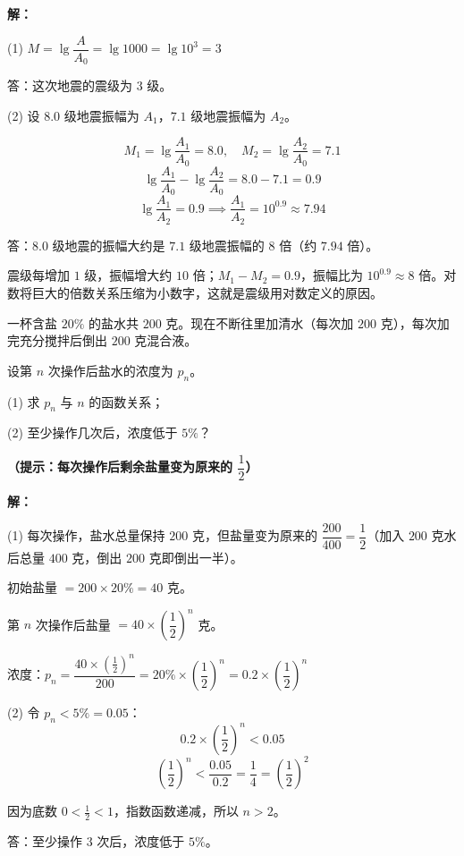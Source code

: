 \documentclass[12pt, a4paper]{ctexart}
\begin{document}
\textbf{解：}

(1) $M = \lg \dfrac{A}{A_0} = \lg 1000 = \lg 10^3 = 3$

答：这次地震的震级为 $3$ 级。

(2) 设 $8.0$ 级地震振幅为 $A_1$，$7.1$ 级地震振幅为 $A_2$。

\[
M_1 = \lg \frac{A_1}{A_0} = 8.0, \quad M_2 = \lg \frac{A_2}{A_0} = 7.1
\]
\[
\lg \frac{A_1}{A_0} - \lg \frac{A_2}{A_0} = 8.0 - 7.1 = 0.9
\]
\[
\lg \frac{A_1}{A_2} = 0.9 \implies \frac{A_1}{A_2} = 10^{0.9} \approx 7.94
\]

答：$8.0$ 级地震的振幅大约是 $7.1$ 级地震振幅的 $8$ 倍（约 $7.94$ 倍）。

\begin{tipbox}[生活中的对数]
震级每增加 $1$ 级，振幅增大约 $10$ 倍；$M_1 - M_2 = 0.9$，振幅比为 $10^{0.9}\approx 8$ 倍。对数将巨大的倍数关系压缩为小数字，这就是震级用对数定义的原因。
\end{tipbox}

\begin{appbox}[【应用3】溶液稀释问题]
一杯含盐 $20\%$ 的盐水共 $200$ 克。现在不断往里加清水（每次加 $200$ 克），每次加完充分搅拌后倒出 $200$ 克混合液。

设第 $n$ 次操作后盐水的浓度为 $p_n$。

(1) 求 $p_n$ 与 $n$ 的函数关系；

(2) 至少操作几次后，浓度低于 $5\%$？

\textbf{（提示：每次操作后剩余盐量变为原来的 $\dfrac{1}{2}$）}
\end{appbox}

\textbf{解：}

(1) 每次操作，盐水总量保持 $200$ 克，但盐量变为原来的 $\dfrac{200}{400} = \dfrac{1}{2}$（加入 $200$ 克水后总量 $400$ 克，倒出 $200$ 克即倒出一半）。

初始盐量 $= 200 \times 20\% = 40$ 克。

第 $n$ 次操作后盐量 $= 40 \times \left(\dfrac{1}{2}\right)^n$ 克。

浓度：$p_n = \dfrac{40 \times (\frac{1}{2})^n}{200} = 20\% \times \left(\dfrac{1}{2}\right)^n = 0.2 \times \left(\dfrac{1}{2}\right)^n$

(2) 令 $p_n < 5\% = 0.05$：
\[
0.2 \times \left(\frac{1}{2}\right)^n < 0.05
\]
\[
\left(\frac{1}{2}\right)^n < \frac{0.05}{0.2} = \frac{1}{4} = \left(\frac{1}{2}\right)^2
\]

因为底数 $0<\frac{1}{2}<1$，指数函数递减，所以 $n>2$。

答：至少操作 $3$ 次后，浓度低于 $5\%$。
\end{document}

